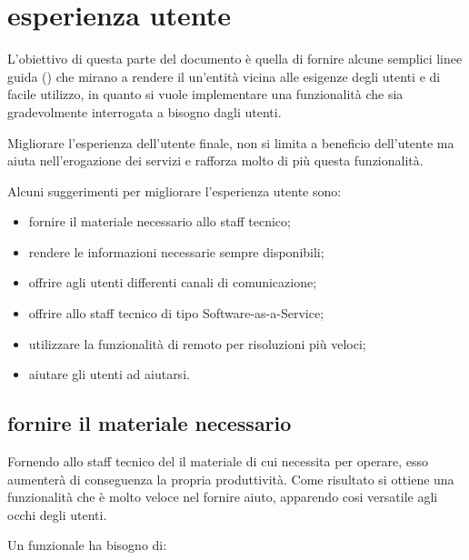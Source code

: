 %
%
\section[Esperienza utente]{esperienza utente}
\label{sd-users-experience}
L'obiettivo di questa parte del documento è quella di fornire alcune semplici linee guida () che mirano a rendere il  un'entità vicina alle esigenze degli utenti e di facile utilizzo, in quanto si vuole implementare una funzionalità che sia gradevolmente interrogata a bisogno dagli utenti.

Migliorare l'esperienza dell'utente finale, non si limita a beneficio dell'utente ma aiuta nell'erogazione dei servizi e rafforza molto di più questa funzionalità.

Alcuni suggerimenti per migliorare l'esperienza utente sono:

\begin{itemize}
\item{fornire il materiale necessario allo staff tecnico;}
\item{rendere le informazioni necessarie sempre disponibili;}
\item{offrire agli utenti differenti canali di comunicazione;}
\item{offrire allo staff tecnico  di tipo \acs{Software-as-a-Service};}
\item{utilizzare la funzionalità di  remoto per risoluzioni più veloci;}
\item{aiutare gli utenti ad aiutarsi.}
\end{itemize}

\subsection[Fornire il materiale necessario]{fornire il materiale necessario}
\label{sd-users-experience-material}
Fornendo allo staff tecnico del  il materiale di cui necessita per operare, esso aumenterà di conseguenza la propria produttività. Come risultato si ottiene una funzionalità che è molto veloce nel fornire aiuto, apparendo cosi versatile agli occhi degli utenti.

Un  funzionale ha bisogno di:

